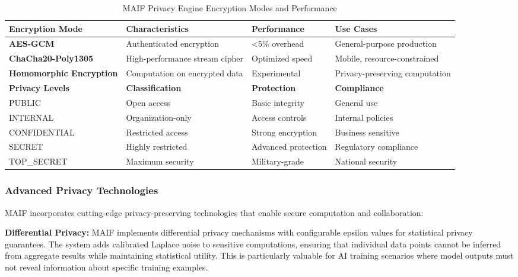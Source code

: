 \documentclass[conference]{IEEEtran}
\begin{document}
\begin{table*}[!t]
\renewcommand{\arraystretch}{1.3}
\caption{MAIF Privacy Engine Encryption Modes and Performance}
\label{tab:encryption-modes}
\centering
\footnotesize
\begin{tabular}{p{3.5cm}p{4cm}p{3cm}p{3.5cm}}
\toprule
\textbf{Encryption Mode} & \textbf{Characteristics} & \textbf{Performance} & \textbf{Use Cases} \\
\midrule
\textbf{AES-GCM} & Authenticated encryption & <5\% overhead & General-purpose production \\
\textbf{ChaCha20-Poly1305} & High-performance stream cipher & Optimized speed & Mobile, resource-constrained \\
\textbf{Homomorphic Encryption} & Computation on encrypted data & Experimental & Privacy-preserving computation \\
\midrule
\textbf{Privacy Levels} & \textbf{Classification} & \textbf{Protection} & \textbf{Compliance} \\
\midrule
PUBLIC & Open access & Basic integrity & General use \\
INTERNAL & Organization-only & Access controls & Internal policies \\
CONFIDENTIAL & Restricted access & Strong encryption & Business sensitive \\
SECRET & Highly restricted & Advanced protection & Regulatory compliance \\
TOP\_SECRET & Maximum security & Military-grade & National security \\
\bottomrule
\end{tabular}
\end{table*}

\subsubsection{Advanced Privacy Technologies}

MAIF incorporates cutting-edge privacy-preserving technologies that enable secure computation and collaboration:

\textbf{Differential Privacy:} MAIF implements differential privacy mechanisms with configurable epsilon values for statistical privacy guarantees. The system adds calibrated Laplace noise to sensitive computations, ensuring that individual data points cannot be inferred from aggregate results while maintaining statistical utility. This is particularly valuable for AI training scenarios where model outputs must not reveal information about specific training examples.
\end{document}
